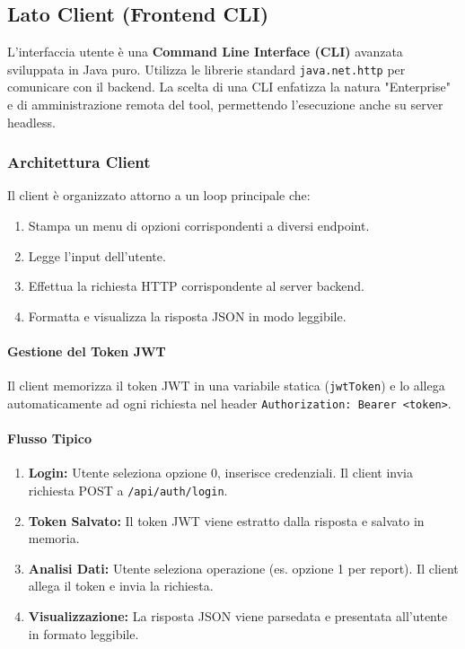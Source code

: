 \documentclass[a4paper,12pt]{report}
\begin{document}
\subsection{Lato Client (Frontend CLI)}
L'interfaccia utente è una \textbf{Command Line Interface (CLI)} avanzata sviluppata in Java puro. Utilizza le librerie standard \texttt{java.net.http} per comunicare con il backend.
La scelta di una CLI enfatizza la natura "Enterprise" e di amministrazione remota del tool, permettendo l'esecuzione anche su server headless.

\subsubsection{Architettura Client}
Il client è organizzato attorno a un loop principale che:
\begin{enumerate}
    \item Stampa un menu di opzioni corrispondenti a diversi endpoint.
    \item Legge l'input dell'utente.
    \item Effettua la richiesta HTTP corrispondente al server backend.
    \item Formatta e visualizza la risposta JSON in modo leggibile.
\end{enumerate}

\paragraph{Gestione del Token JWT}
Il client memorizza il token JWT in una variabile statica (\texttt{jwtToken}) e lo allega automaticamente ad ogni richiesta nel header \texttt{Authorization: Bearer <token>}.

\paragraph{Flusso Tipico}
\begin{enumerate}
    \item \textbf{Login:} Utente seleziona opzione 0, inserisce credenziali. Il client invia richiesta POST a \texttt{/api/auth/login}.
    \item \textbf{Token Salvato:} Il token JWT viene estratto dalla risposta e salvato in memoria.
    \item \textbf{Analisi Dati:} Utente seleziona operazione (es. opzione 1 per report). Il client allega il token e invia la richiesta.
    \item \textbf{Visualizzazione:} La risposta JSON viene parsedata e presentata all'utente in formato leggibile.
\end{enumerate}
\end{document}
